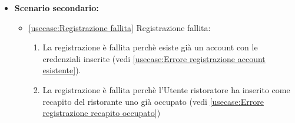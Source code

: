 \begin{itemize}
    \item \textbf{Scenario secondario:}
          \begin{itemize}
              \item \autoref{usecase:Registrazione fallita} Registrazione fallita:
              \begin{enumerate}
                  \item La registrazione è fallita perchè esiste già un account con le credenziali inserite (vedi \autoref{usecase:Errore registrazione account esistente}).
                  \item La registrazione è fallita perchè l'Utente ristoratore ha inserito come recapito del ristorante uno già occupato (vedi \autoref{usecase:Errore registrazione recapito occupato})
              \end{enumerate}	
          \end{itemize}
	
\end{itemize}


